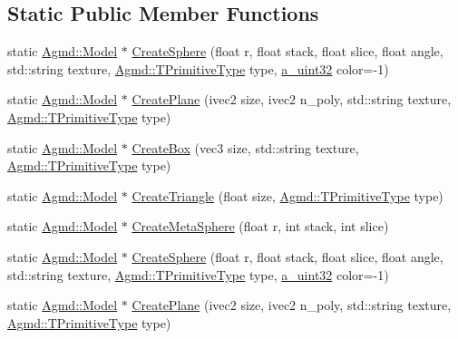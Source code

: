\subsection*{Static Public Member Functions}
\begin{DoxyCompactItemize}
\item 
static \hyperlink{class_agmd_1_1_model}{Agmd\+::\+Model} $\ast$ \hyperlink{class_app_ae87db10b2c7434e9bd0cc5497f9c3c3a}{Create\+Sphere} (float r, float stack, float slice, float angle, std\+::string texture, \hyperlink{namespace_agmd_a0e38d0c34891ddd6eef72e1c9e55161c}{Agmd\+::\+T\+Primitive\+Type} type, \hyperlink{_common_defines_8h_a964296f9770051b9e4807b1f180dd416}{a\+\_\+uint32} color=-\/1)
\item 
static \hyperlink{class_agmd_1_1_model}{Agmd\+::\+Model} $\ast$ \hyperlink{class_app_af4b83db23e669aa59440eb8f7f876a61}{Create\+Plane} (ivec2 size, ivec2 n\+\_\+poly, std\+::string texture, \hyperlink{namespace_agmd_a0e38d0c34891ddd6eef72e1c9e55161c}{Agmd\+::\+T\+Primitive\+Type} type)
\item 
static \hyperlink{class_agmd_1_1_model}{Agmd\+::\+Model} $\ast$ \hyperlink{class_app_a3fb8a432f22cd59233fb2457a102b31a}{Create\+Box} (vec3 size, std\+::string texture, \hyperlink{namespace_agmd_a0e38d0c34891ddd6eef72e1c9e55161c}{Agmd\+::\+T\+Primitive\+Type} type)
\item 
static \hyperlink{class_agmd_1_1_model}{Agmd\+::\+Model} $\ast$ \hyperlink{class_app_ad643f72e1803fdfe587f023f7e1e9f2d}{Create\+Triangle} (float size, \hyperlink{namespace_agmd_a0e38d0c34891ddd6eef72e1c9e55161c}{Agmd\+::\+T\+Primitive\+Type} type)
\item 
static \hyperlink{class_agmd_1_1_model}{Agmd\+::\+Model} $\ast$ \hyperlink{class_app_a5f27e24cafae7b6d03b10f0fa55b3b90}{Create\+Meta\+Sphere} (float r, int stack, int slice)
\item 
static \hyperlink{class_agmd_1_1_model}{Agmd\+::\+Model} $\ast$ \hyperlink{class_app_a01d63555a496dffe89879e499031a14d}{Create\+Sphere} (float r, float stack, float slice, float angle, std\+::string texture, \hyperlink{namespace_agmd_a0e38d0c34891ddd6eef72e1c9e55161c}{Agmd\+::\+T\+Primitive\+Type} type, \hyperlink{_common_defines_8h_a964296f9770051b9e4807b1f180dd416}{a\+\_\+uint32} color=-\/1)
\item 
static \hyperlink{class_agmd_1_1_model}{Agmd\+::\+Model} $\ast$ \hyperlink{class_app_af9ecac5143d2ef364e7b92fdf1f41d01}{Create\+Plane} (ivec2 size, ivec2 n\+\_\+poly, std\+::string texture, \hyperlink{namespace_agmd_a0e38d0c34891ddd6eef72e1c9e55161c}{Agmd\+::\+T\+Primitive\+Type} type)

\end{DoxyCompactItemize}
